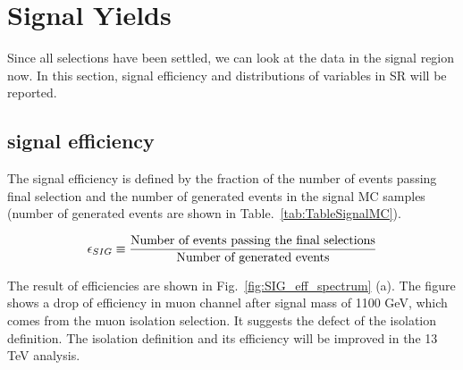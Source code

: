 \section{Signal Yields}
Since all selections have been settled, we can look at the data in the signal region now. In this section, signal efficiency and distributions of variables in SR will be reported. 

\subsection{signal efficiency}
The signal efficiency is defined by the fraction of the number of events passing final selection and the number of generated events in the signal MC samples (number of generated events are shown in Table.~\ref{tab:TableSignalMC}). 

\begin{align}
  \label{eq:SIGeff}
  \epsilon_{SIG}\equiv \frac{\textup{Number of events passing the final selections}}{\textup{Number of generated events}}
\end{align}

The result of efficiencies are shown in Fig.~\ref{fig:SIG_eff_spectrum} (a). The figure shows a drop of efficiency in muon channel after signal mass of 1100 GeV, which comes from the muon isolation selection. It suggests the defect of the isolation definition. The isolation definition and its efficiency will be improved in the 13 TeV analysis.

